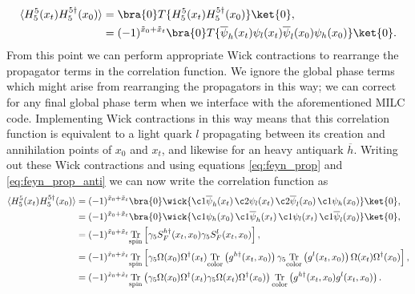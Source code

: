 \begin{equation}
\begin{split}
    \langle H^5_5(x_t) H^{5\dagger}_5(x_0)\rangle &= \bra{0}T\{ H^5_5(x_t) H^{5\dagger}_5(x_0)\}\ket{0}, \\
    &= (-1)^{\tilde{x}_0+\tilde{x}_t}
    \bra{0}T\{ \overline{\psi}_h(x_t)\psi_l(x_t) \overline{\psi}_l(x_0)\psi_h(x_0)   \}\ket{0}.
\end{split}
\end{equation}
From this point we can perform appropriate Wick contractions to rearrange the propagator terms in the correlation function.  We ignore the global phase terms which might arise from rearranging the propagators in this way; we can correct for any final global phase term when we interface with the aforementioned MILC code.  Implementing Wick contractions in this way means that this correlation function is equivalent to a light quark $l$ propagating between its creation and annihilation points of $x_0$ and $x_t$, and likewise for an heavy antiquark $\overline{h}$.  Writing out these Wick contractions and using equations \ref{eq:feyn_prop} and \ref{eq:feyn_prop_anti} we can now write the correlation function as
\begin{equation}\label{eq:big2ptderive}
\begin{split}
    \langle H^5_5(x_t) H^{5\dagger}_5(x_0)\rangle &=
    (-1)^{\tilde{x}_0+\tilde{x}_t}
    \bra{0}\wick{ 
  \c1{\overline{\psi}}_h(x_t)\, \c2\psi_l(x_t)\,
  \c2{\overline{\psi}}_l(x_0)\, \c1\psi_h(x_0)
  } \ket{0}, \\
  &= (-1)^{\tilde{x}_0+\tilde{x}_t} \bra{0} \wick{ 
  \c1{{\psi}}_h(x_0)\, \c1{\overline{\psi}}_h(x_t)\,
  \c1{{\psi}}_l(x_t)\, \c1{\overline{\psi}}_l(x_0)
  } \ket{0},\\
  &= (-1)^{\tilde{x}_0+\tilde{x}_t}\mathrm{\underset{{spin}}{Tr}}\left[\gamma_5 S_F^{h\dagger}(x_t,x_0)\gamma_5 S^l_F(x_t,x_0)\right],\\
  &= (-1)^{\tilde{x}_0+\tilde{x}_t}\mathrm{\underset{{spin}}{Tr}}\left[\gamma_5 \Omega(x_0)\Omega^\dagger(x_t)
  \mathrm{\underset{{color}}{Tr}}\left(g^{h\dagger}(x_t,x_0)\right)\gamma_5 \mathrm{\underset{color}{Tr}}\left(g^l(x_t,x_0)\right) 
  \Omega(x_t)\Omega^\dagger(x_0)  \right],\\
  &= (-1)^{\tilde{x}_0+\tilde{x}_t}\mathrm{\underset{{spin}}{Tr}}\left(\gamma_5 \Omega(x_0)\Omega^\dagger(x_t)\gamma_5\Omega(x_t)\Omega^\dagger(x_0)\right)
  \mathrm{\underset{{color}}{Tr}}\left(g^{h\dagger}(x_t,x_0)g^l(x_t,x_0)\right).   
\end{split}
\end{equation}
